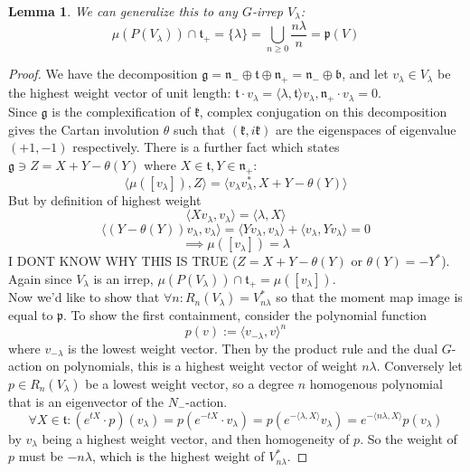 \documentclass{article}
\newtheorem{lemma}[theorem]{Lemma}
\begin{document}
\begin{lemma}
We can generalize this to any $G$-irrep $V_{\lambda}$:
\[ \mu(P(V_{\lambda})) \cap \mathfrak{t}_{+} = \{\lambda\} = \bigcup_{n \geq 0} \frac{n \lambda}{n} = \mathfrak{p}(V) \]
\end{lemma}
\begin{proof}
We have the decomposition $\mathfrak{g} = \mathfrak{n}_{-} \oplus \mathfrak{t} \oplus \mathfrak{n}_{+} = \mathfrak{n}_{-} \oplus \mathfrak{b}$, and let $v_{\lambda} \in V_{\lambda}$ be the highest weight vector of unit length: $\mathfrak{t} \cdot v_{\lambda} = \langle \lambda, \mathfrak{t} \rangle v_{\lambda}, \mathfrak{n}_{+} \cdot v_{\lambda} = 0$. 
\\ Since $\mathfrak{g}$ is the complexification of $\mathfrak{k}$, complex conjugation on this decomposition gives the Cartan involution $\theta$ such that $(\mathfrak{k},i \mathfrak{k})$ are the eigenspaces of eigenvalue $(+1,-1)$ respectively. There is a further fact which states $\mathfrak{g} \ni Z = X + Y - \theta(Y)$ where $X \in \mathfrak{t}, Y \in \mathfrak{n}_{+}$:
\[ \langle \mu([v_{\lambda}]), Z \rangle = \langle v_{\lambda} v_{\lambda}^{*}, X + Y - \theta(Y) \rangle \]
But by definition of highest weight 
\[ \langle X v_{\lambda}, v_{\lambda} \rangle = \langle \lambda, X \rangle \]
\[ \langle (Y - \theta(Y)) v_{\lambda}, v_{\lambda} \rangle = \langle Y v_{\lambda}, v_{\lambda} \rangle + \langle v_{\lambda}, Y v_{\lambda} \rangle = 0 \]
\[ \implies \mu([v_{\lambda}]) = \lambda \]
I DONT KNOW WHY THIS IS TRUE ($Z = X + Y - \theta(Y)$ or $\theta(Y) = - Y^{*}$). 
\\ Again since $V_{\lambda}$ is an irrep, $\mu(P(V_{\lambda})) \cap \mathfrak{t}_{+} = \mu([v_{\lambda}])$. 
\\ Now we'd like to show that $\forall n: R_{n}(V_{\lambda}) = V_{n \lambda}^{*}$ so that the moment map image is equal to $\mathfrak{p}$. To show the first containment, consider the polynomial function
\[ p(v) := \langle v_{-\lambda}, v \rangle^{n}   \]
where $v_{-\lambda}$ is the lowest weight vector. Then by the product rule and the dual $G$-action on polynomials, this is a highest weight vector of weight $n \lambda$. Conversely let $p \in R_{n}(V_{\lambda})$ be a lowest weight vector, so a degree $n$ homogenous polynomial that is an eigenvector of the $N_{-}$-action. 
\[ \forall X \in \mathfrak{t}: (e^{tX} \cdot p)(v_{\lambda}) = p(e^{-tX} \cdot v_{\lambda}) =  p(e^{-\langle \lambda, X \rangle} v_{\lambda}) = e^{-\langle n \lambda, X \rangle} p(v_{\lambda}) \]
by $v_{\lambda}$ being a highest weight vector, and then homogeneity of $p$. So the weight of $p$ must be $-n \lambda$, which is the highest weight of $V_{n \lambda}^{*}$. 
\end{proof}
\end{document}
